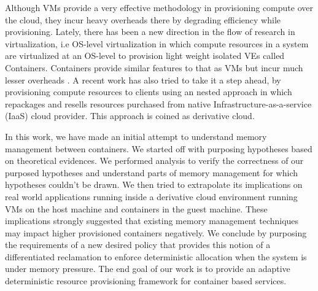\documentclass[11pt,a4paper,openright]{report}
\begin{document}
    Although VMs provide a very effective methodology in provisioning compute over the cloud, they incur heavy overheads there by degrading 
efficiency while provisioning. Lately, there has been a new direction in the flow of research in virtualization, i.e OS-level virtualization 
in which compute resources in a system are virtualized at an OS-level to provision light weight isolated VEs called Containers. Containers 
provide similar features to that as VMs but incur much lesser overheads \cite{felter2015updated} \cite{morabito2015hypervisors} . A recent 
work \cite{sharma2015spotcheck} has also tried to take it a step ahead, by provisioning compute resources to clients using an nested 
approach in which repackages and resells resources purchased from native Infrastructure-as-a-service (IaaS) cloud provider. This approach is 
coined as derivative cloud.

    In this work, we have made an initial attempt to understand memory management between containers. We started off with purposing 
hypotheses based on theoretical evidences. We performed analysis to verify the correctness of our purposed hypotheses and understand parts 
of memory management for which hypotheses couldn't be drawn. We then tried to extrapolate its implications on real world applications 
running inside a derivative cloud environment running VMs on the host machine and containers in the guest machine. These implications 
strongly suggested that existing memory management techniques may impact higher provisioned containers negatively. We conclude by purposing 
the requirements of a new desired policy that provides this notion of a differentiated reclamation to enforce deterministic allocation when 
the system is under memory pressure. The end goal of our work is to provide an adaptive deterministic resource provisioning framework for 
container based services. 




    
  \tableofcontents
  \listoftables
  \listoffigures
  \cleardoublepage
  \setcounter{page}{1}
  \setlength{\parskip}{1em}
  
    
   
  
  
  
  
  
  
  
  
    
  
\end{document}
